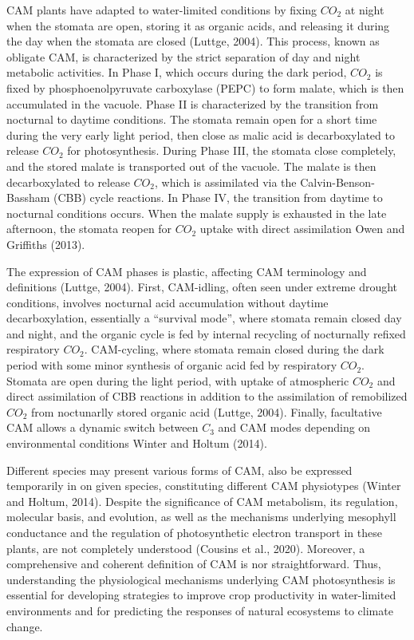 \documentclass[
  12pt,
  letterpaper,
  DIV=11,
  numbers=noendperiod]{scrartcl}
\begin{document}
CAM plants have adapted to water-limited conditions by fixing \(CO_2\)
at night when the stomata are open, storing it as organic acids, and
releasing it during the day when the stomata are closed (Luttge, 2004).
This process, known as obligate CAM, is characterized by the strict
separation of day and night metabolic activities. In Phase I, which
occurs during the dark period, \(CO_2\) is fixed by phosphoenolpyruvate
carboxylase (PEPC) to form malate, which is then accumulated in the
vacuole. Phase II is characterized by the transition from nocturnal to
daytime conditions. The stomata remain open for a short time during the
very early light period, then close as malic acid is decarboxylated to
release \(CO_2\) for photosynthesis. During Phase III, the stomata close
completely, and the stored malate is transported out of the vacuole. The
malate is then decarboxylated to release \(CO_2\), which is assimilated
via the Calvin-Benson-Bassham (CBB) cycle reactions. In Phase IV, the
transition from daytime to nocturnal conditions occurs. When the malate
supply is exhausted in the late afternoon, the stomata reopen for
\(CO_2\) uptake with direct assimilation Owen and Griffiths (2013).

The expression of CAM phases is plastic, affecting CAM terminology and
definitions (Luttge, 2004). First, CAM-idling, often seen under extreme
drought conditions, involves nocturnal acid accumulation without daytime
decarboxylation, essentially a ``survival mode'', where stomata remain
closed day and night, and the organic cycle is fed by internal recycling
of nocturnally refixed respiratory \(CO_2\). CAM-cycling, where stomata
remain closed during the dark period with some minor synthesis of
organic acid fed by respiratory \(CO_2\). Stomata are open during the
light period, with uptake of atmospheric \(CO_2\) and direct
assimilation of CBB reactions in addition to the assimilation of
remobilized \(CO_2\) from noctunarlly stored organic acid (Luttge,
2004). Finally, facultative CAM allows a dynamic switch between \(C_3\)
and CAM modes depending on environmental conditions Winter and Holtum
(2014).

Different species may present various forms of CAM, also be expressed
temporarily in on given species, constituting different CAM physiotypes
(Winter and Holtum, 2014). Despite the significance of CAM metabolism,
its regulation, molecular basis, and evolution, as well as the
mechanisms underlying mesophyll conductance and the regulation of
photosynthetic electron transport in these plants, are not completely
understood (Cousins et al., 2020). Moreover, a comprehensive and
coherent definition of CAM is nor straightforward. Thus, understanding
the physiological mechanisms underlying CAM photosynthesis is essential
for developing strategies to improve crop productivity in water-limited
environments and for predicting the responses of natural ecosystems to
climate change.
\end{document}
